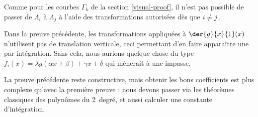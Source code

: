 

Comme pour les courbes $\Gamma_k$ de la section \ref{visual-proof}, il n'est pas possible de passer de $\Lambda_i$  à $\Lambda_j$ à l'aide des transformations autorisées dès que $i \neq j$\,.




\begin{remark}
	Dans la preuve précédente, les transformations appliquées à $\der{g}{x}{1}(x)$ n'utilisent pas de translation verticale, ceci permettant d'en faire apparaître une par intégration.
	Sans cela, nous aurions quelque chose du type $f_i(x) = \lambda g(\alpha x + \beta) + \gamma x + \delta$ qui mènerait à une impasse.
\end{remark}




\begin{remark}
	La preuve précédente reste constructive, mais obtenir les bons coefficients est plus complexe qu'avec la première preuve : nous devons passer via les théorèmes classiques des polynômes du 2\ieme\ degré, et aussi calculer une constante d'intégration.
\end{remark}

